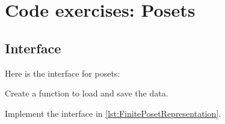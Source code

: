 
\section{\usebox{\chaptergear}
  Code exercises: Posets}

\begin{figure}

    \caption{}
    \label{fig:poset-finiteposet}
\end{figure}

\subsection*{Interface}

Here is the interface for posets:


%




\begin{codeexercise}
    Create a function to load and save the data.

    Implement the interface in \cref{lst:FinitePosetRepresentation}.
\end{codeexercise}



